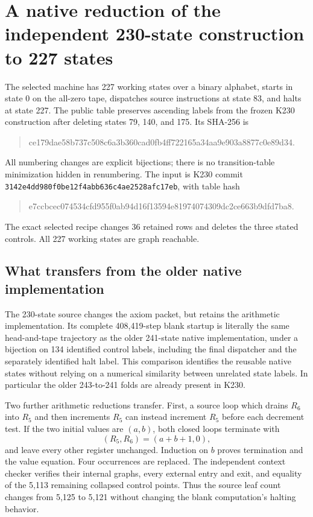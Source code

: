 \section{A native reduction of the independent 230-state construction to 227 states}
\label{sec:native227}

The selected machine has 227 working states over a binary alphabet, starts in
state 0 on the all-zero tape, dispatches source instructions at state 83, and
halts at state 227.  The public table preserves ascending labels from the frozen
K230 construction after deleting states 79, 140, and 175.  Its SHA-256 is
\begin{quote}\small\ttfamily
ce179dae58b737c508c6a3b360cad0fb4ff722165a34aa9e903a8877c0e89d34.
\end{quote}
All numbering changes are explicit bijections; there is no transition-table
minimization hidden in renumbering.  The input is K230 commit
\texttt{3142e4dd980f0be12f4abb636c4ae2528afc17eb}, with table hash
\begin{quote}\small\ttfamily
e7ccbcec074534cfd955f0ab94d16f13594e81974074309dc2ce663b9dfd7ba8.
\end{quote}
The exact selected recipe changes 36 retained rows and deletes the three stated
controls.  All 227 working states are graph reachable.

\subsection{What transfers from the older native implementation}

The 230-state source changes the axiom packet, but retains the arithmetic
implementation.  Its complete 408,419-step blank startup is literally the same
head-and-tape trajectory as the older 241-state native implementation, under a
bijection on 134 identified control labels, including the final dispatcher
and the separately identified halt label.  This comparison identifies the reusable native states without relying
on a numerical similarity between unrelated state labels.  In particular the
older 243-to-241 folds are already present in K230.

Two further arithmetic reductions transfer.  First, a source loop which drains
$R_6$ into $R_5$ and then increments $R_5$ can instead increment $R_5$ before each
decrement test.  If the two initial values are $(a,b)$, both closed loops
terminate with
\[
 (R_5,R_6)=(a+b+1,0),
\]
and leave every other register unchanged.  Induction on $b$ proves termination
and the value equation.  Four occurrences are replaced.  The independent
context checker verifies their internal graphs, every external entry and exit,
and equality of the 5,113 remaining collapsed control points.  Thus the source
leaf count changes from 5,125 to 5,121 without changing the blank computation's
halting behavior.

